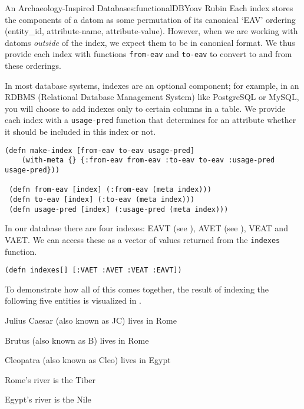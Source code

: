 \begin{aosachapter}{An Archaeology-Inspired Database}{s:functionalDB}{Yoav Rubin}
Each index stores the components of a datom as some permutation of its
canonical `EAV' ordering (entity\_id, attribute-name, attribute-value).
However, when we are working with datoms \emph{outside} of the index, we
expect them to be in canonical format. We thus provide each index with
functions \texttt{from-eav} and \texttt{to-eav} to convert to and from
these orderings.

In most database systems, indexes are an optional component; for
example, in an RDBMS (Relational Database Management System) like
PostgreSQL or MySQL, you will choose to add indexes only to certain
columns in a table. We provide each index with a \texttt{usage-pred}
function that determines for an attribute whether it should be included
in this index or not.

\begin{verbatim}
(defn make-index [from-eav to-eav usage-pred]
    (with-meta {} {:from-eav from-eav :to-eav to-eav :usage-pred usage-pred}))
 
 (defn from-eav [index] (:from-eav (meta index)))
 (defn to-eav [index] (:to-eav (meta index)))
 (defn usage-pred [index] (:usage-pred (meta index)))
\end{verbatim}

In our database there are four indexes: EAVT (see
), AVET (see
), VEAT and VAET. We can access these
as a vector of values returned from the \texttt{indexes} function.

\begin{verbatim}
(defn indexes[] [:VAET :AVET :VEAT :EAVT])
\end{verbatim}

To demonstrate how all of this comes together, the result of indexing
the following five entities is visualized in
.

\begin{aosaenumerate}
\def\labelenumi{\arabic{enumi}.}

\item
  Julius Caesar (also known as JC) lives in Rome
\item
  Brutus (also known as B) lives in Rome
\item
  Cleopatra (also known as Cleo) lives in Egypt
\item
  Rome's river is the Tiber
\item
  Egypt's river is the Nile
\end{aosaenumerate}


\end{aosachapter}
